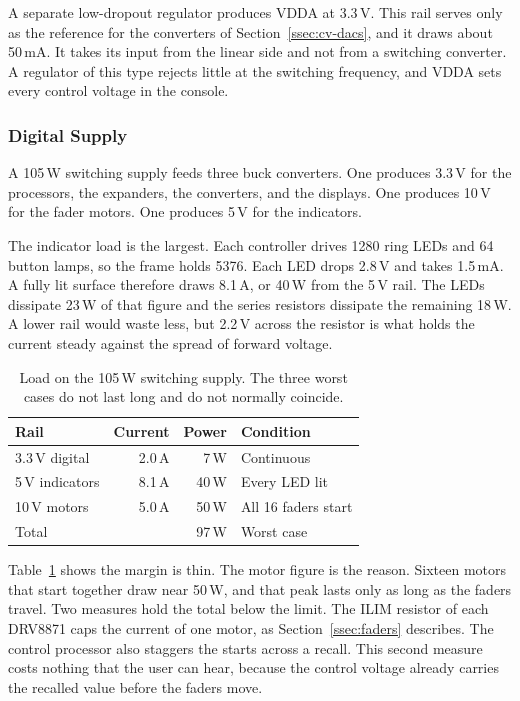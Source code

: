 \documentclass[11pt, letterpaper,titlepage]{article}
\begin{document}
A separate low-dropout regulator produces VDDA at 3.3\,V. This rail serves only
as the reference for the converters of Section~\ref{ssec:cv-dacs}, and it draws
about 50\,mA. It takes its input from the linear side and not from a switching
converter. A regulator of this type rejects little at the switching frequency,
and VDDA sets every control voltage in the console.

\subsubsection*{Digital Supply}
\label{sssec:psu-digital}

A 105\,W switching supply feeds three buck converters. One produces 3.3\,V for
the processors, the expanders, the converters, and the displays. One produces
10\,V for the fader motors. One produces 5\,V for the indicators.

The indicator load is the largest. Each controller drives 1280 ring LEDs and 64
button lamps, so the frame holds 5376. Each LED drops 2.8\,V and takes 1.5\,mA.
A fully lit surface therefore draws 8.1\,A, or 40\,W from the 5\,V rail. The LEDs
dissipate 23\,W of that figure and the series resistors dissipate the remaining
18\,W. A lower rail would waste less, but 2.2\,V across the resistor is what
holds the current steady against the spread of forward voltage.

\begin{table}[t]
\centering
\caption{Load on the 105\,W switching supply. The three worst cases do not last
long and do not normally coincide.}
\label{tab:power-budget}
\begin{tabular}{l r r l}
\toprule
\textbf{Rail} & \textbf{Current} & \textbf{Power} & \textbf{Condition} \\
\midrule
3.3\,V digital & 2.0\,A & 7\,W & Continuous \\
5\,V indicators & 8.1\,A & 40\,W & Every LED lit \\
10\,V motors & 5.0\,A & 50\,W & All 16 faders start \\
\midrule
Total & & 97\,W & Worst case \\
\bottomrule
\end{tabular}
\end{table}

Table~\ref{tab:power-budget} shows the margin is thin. The motor figure is the
reason. Sixteen motors that start together draw near 50\,W, and that peak lasts
only as long as the faders travel. Two measures hold the total below the limit.
The ILIM resistor of each DRV8871 caps the current of one motor, as
Section~\ref{ssec:faders} describes. The control processor also staggers the
starts across a recall. This second measure costs nothing that the user can
hear, because the control voltage already carries the recalled value before the
faders move.
\end{document}
